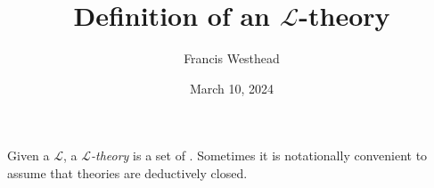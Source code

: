 \documentclass[a4paper]{article}
\title{Definition of an \(\mathcal {L}\)-theory}
\date{March 10, 2024}
\author{Francis Westhead}
\begin{document}
\maketitle
\par{
    Given a  \(\mathcal {L}\), a \emph{\(\mathcal {L}\)-theory} is a set of . Sometimes it is notationally convenient to assume that theories are deductively closed.
}
\printbibliography
\end{document}
